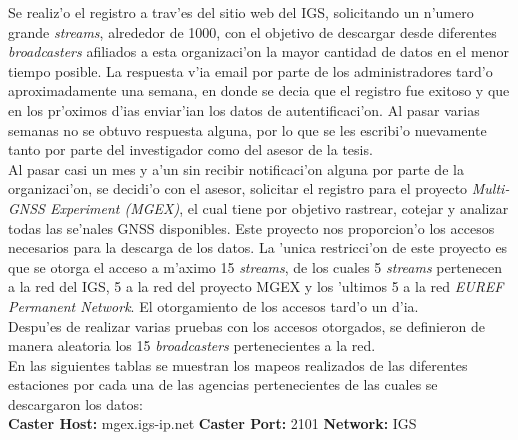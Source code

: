 Se realiz'o el registro a trav'es del sitio web del IGS, solicitando un n'umero grande \emph{streams}, alrededor de 1000, con el objetivo de descargar desde diferentes \emph{broadcasters} afiliados a esta organizaci'on la mayor cantidad de datos en el menor tiempo posible. La respuesta v'ia email por parte de los administradores tard'o aproximadamente una semana, en donde se decia que el registro fue exitoso y que en los pr'oximos d'ias enviar'ian los datos de autentificaci'on. Al pasar varias semanas no se obtuvo respuesta alguna, por lo que se les escribi'o nuevamente tanto por parte del investigador como del asesor de la tesis.\\

Al pasar casi un mes y a'un sin recibir notificaci'on alguna por parte de la organizaci'on, se decidi'o con el asesor, solicitar el registro para el proyecto \emph{Multi-GNSS Experiment (MGEX)}, el cual tiene por objetivo rastrear, cotejar y analizar todas las se'nales GNSS disponibles. Este proyecto nos proporcion'o los accesos necesarios para la descarga de los datos. La 'unica restricci'on de este proyecto es que se otorga el acceso a m'aximo 15 \emph{streams}, de los cuales 5 \emph{streams} pertenecen a la red del IGS, 5 a la red del proyecto MGEX y los 'ultimos 5 a la red \emph{EUREF Permanent Network}. El otorgamiento de los accesos tard'o un d'ia. \\

Despu'es de realizar varias pruebas con los accesos otorgados, se definieron de manera aleatoria los 15 \emph{broadcasters} pertenecientes a la red. \\

En las siguientes tablas se muestran los mapeos realizados de las diferentes estaciones por cada una de las agencias pertenecientes de las cuales se descargaron los datos:\\

\textbf{Caster Host:} mgex.igs-ip.net
\textbf{Caster Port:} 2101
\textbf{Network:} IGS

